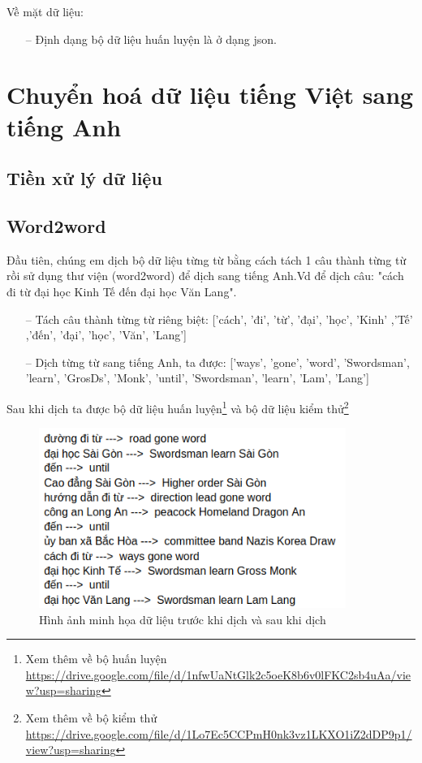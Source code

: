 Về mặt dữ liệu:
\begin{itemize}
    \item[--] Định dạng bộ dữ liệu huấn luyện là ở dạng json.
\end{itemize}

\section{Chuyển hoá dữ liệu tiếng Việt sang tiếng Anh}
\subsection{Tiền xử lý dữ liệu}


\subsection{Word2word}

Đầu tiên, chúng em dịch bộ dữ liệu từng từ bằng cách tách 1 câu thành từng từ rồi sử dụng thư viện (word2word) để dịch sang tiếng Anh.Vd để dịch câu: "cách đi từ đại học Kinh Tế đến đại học Văn Lang".
\begin{itemize}
    \item[--] Tách câu thành từng từ riêng biệt: ['cách', 'đi', 'từ', 'đại', 'học', 'Kinh' ,'Tế' ,'đến', 'đại', 'học', 'Văn', 'Lang']
    \item[--] Dịch từng từ sang tiếng Anh, ta được: ['ways', 'gone', 'word', 'Swordsman', 'learn', 'GrosDs', 'Monk', 'until', 'Swordsman', 'learn', 'Lam', 'Lang']
\end{itemize}

Sau khi dịch ta được bộ dữ liệu huấn luyện\footnote{Xem thêm về bộ huấn luyện \url{https://drive.google.com/file/d/1nfwUaNtGlk2c5oeK8b6v0lFKC2sb4uAa/view?usp=sharing}} và bộ dữ liệu kiểm thử\footnote{Xem thêm về bộ kiểm thử \url{https://drive.google.com/file/d/1Lo7Ec5CCPmH0nk3vz1LKXO1iZ2dDP9p1/view?usp=sharing}}
\begin{figure}[htp]
    \centering
    \includegraphics[width=10cm]{images/trainingdata_dichtungtu.png}
    \caption{Hình ảnh minh họa dữ liệu trước khi dịch và sau khi dịch}
    \label{fig:trainingdata_dichtungtu}
\end{figure}

